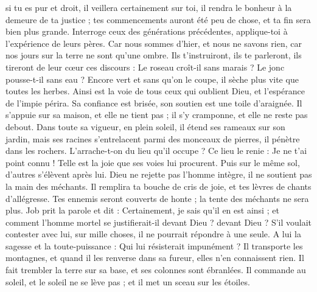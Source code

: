 \begin{multicols}{2}
si tu es pur et droit, il veillera certainement sur toi, il rendra le bonheur à la demeure de ta justice ;
tes commencements auront été peu de chose, et ta fin sera bien plus grande.
Interroge ceux des générations précédentes, applique-toi à l'expérience de leurs pères.
Car nous sommes d'hier, et nous ne savons rien, car nos jours sur la terre ne sont qu'une ombre.
Ils t'instruiront, ils te parleront, ils tireront de leur cœur ces discours :
Le roseau croît-il sans marais ? Le jonc pousse-t-il sans eau ?
Encore vert et sans qu'on le coupe, il sèche plus vite que toutes les herbes.
Ainsi est la voie de tous ceux qui oublient Dieu, et l'espérance de l'impie périra.
Sa confiance est brisée, son soutien est une toile d'araignée.
Il s'appuie sur sa maison, et elle ne tient pas ; il s'y cramponne, et elle ne reste pas debout.
Dans toute sa vigueur, en plein soleil, il étend ses rameaux sur son jardin,
mais ses racines s'entrelacent parmi des monceaux de pierres, il pénètre dans les rochers.
L'arrache-t-on du lieu qu'il occupe ? Ce lieu le renie : Je ne t'ai point connu !
Telle est la joie que ses voies lui procurent. Puis sur le même sol, d'autres s'élèvent après lui.
Dieu ne rejette pas l'homme intègre, il ne soutient pas la main des méchants.
Il remplira ta bouche de cris de joie, et tes lèvres de chants d'allégresse.
Tes ennemis seront couverts de honte ; la tente des méchants ne sera plus.
\VerseOne{}Job prit la parole et dit :
Certainement, je sais qu'il en est ainsi ; et comment l'homme mortel se justifierait-il devant Dieu ?  devant Dieu ?
S'il voulait contester avec lui, sur mille choses, il ne pourrait répondre à une seule.
A lui la sagesse et la toute-puissance : Qui lui résisterait impunément ?
Il transporte les montagnes, et quand il les renverse dans sa fureur, elles n'en connaissent rien.
Il fait trembler la terre sur sa base, et ses colonnes sont ébranlées.
Il commande au soleil, et le soleil ne se lève pas ; et il met un sceau sur les étoiles.

\end{multicols}
